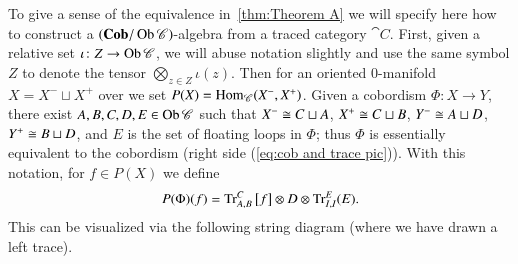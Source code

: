\documentclass[12pt,oneside,article,draft]{memoir}
\begin{document}
To give a sense of the equivalence in~\ref{thm:Theorem A} we will specify here how to construct a $(\mathbf{Cob}/\operatorname{Ob}\mathscr{C})$-algebra from a traced category $\cat{C}$.
First, given a relative set $\iota\colon Z\to\operatorname{Ob}\mathscr{C}$, we will abuse notation slightly and use the same symbol $Z$ to denote the tensor $\bigotimes_{z\in Z}\iota(z)$.
Then for an oriented 0-manifold $X=X^-\sqcup X^+$ over we set $P(X)=\operatorname{Hom}_{\mathscr{C}}(X^-,X^+)$.
Given a cobordism $\Phi\colon X\to Y$, there exist $A,B,C,D,E\in\operatorname{Ob}\mathscr{C}$ such that $X^-\cong C\sqcup A$, $X^+\cong C\sqcup B$, $Y^-\cong A\sqcup D$, $Y^+\cong B\sqcup D$, and $E$ is the set of floating loops in $\Phi$; thus $\Phi$ is essentially equivalent to the cobordism (right side (\ref{eq:cob and trace pic})).
With this notation, for $f\in P(X)$ we define 
\begin{equation}\label{eq:cob algebra formula}
	P(\Phi)(f)=\operatorname{Tr}_{A,B}^C\big[f\big]\otimes D\otimes\operatorname{Tr}^E_{I,I}(E).
\end{equation}
This can be visualized via the following string diagram (where we have drawn a left trace).
\end{document}
